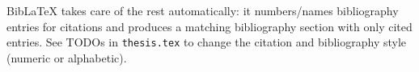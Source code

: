BibLaTeX takes care of the rest automatically: it numbers/names bibliography entries for citations and produces a matching bibliography section with only cited entries.
See TODOs in \verb|thesis.tex| to change the citation and bibliography style (numeric or alphabetic).

\nocite{ex5,ex6,ex7,ex8,ex9,ex10,ex11,ex12,chatgpt,copilot}

